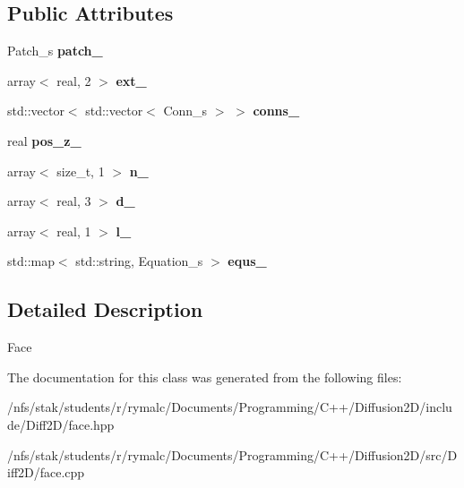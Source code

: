 \subsection*{Public Attributes}
\begin{DoxyCompactItemize}
\item 
\hypertarget{classFace_a2e53c055a4d8492b42995db563e1fc7a}{
Patch\_\-s {\bfseries patch\_\-}}
\label{classFace_a2e53c055a4d8492b42995db563e1fc7a}

\item 
\hypertarget{classFace_a0922668c4175d0274024a5869b310a63}{
array$<$ real, 2 $>$ {\bfseries ext\_\-}}
\label{classFace_a0922668c4175d0274024a5869b310a63}

\item 
\hypertarget{classFace_ac831a8581fa641c54f4adb6e6b3dfe71}{
std::vector$<$ std::vector$<$ Conn\_\-s $>$ $>$ {\bfseries conns\_\-}}
\label{classFace_ac831a8581fa641c54f4adb6e6b3dfe71}

\item 
\hypertarget{classFace_a639f6d684b3a55d69528b5b6f5976937}{
real {\bfseries pos\_\-z\_\-}}
\label{classFace_a639f6d684b3a55d69528b5b6f5976937}

\item 
\hypertarget{classFace_af798b428f231a2f7fad13a386a5c4d7f}{
array$<$ size\_\-t, 1 $>$ {\bfseries n\_\-}}
\label{classFace_af798b428f231a2f7fad13a386a5c4d7f}

\item 
\hypertarget{classFace_a7d41239f934e8819874b5fb515d43380}{
array$<$ real, 3 $>$ {\bfseries d\_\-}}
\label{classFace_a7d41239f934e8819874b5fb515d43380}

\item 
\hypertarget{classFace_a75033fb2521fcb2c613782f831f42bb3}{
array$<$ real, 1 $>$ {\bfseries l\_\-}}
\label{classFace_a75033fb2521fcb2c613782f831f42bb3}

\item 
\hypertarget{classFace_a46b37a1eaba00ad44cf46b6da1391b30}{
std::map$<$ std::string, Equation\_\-s $>$ {\bfseries equs\_\-}}
\label{classFace_a46b37a1eaba00ad44cf46b6da1391b30}

\end{DoxyCompactItemize}


\subsection{Detailed Description}
Face 

The documentation for this class was generated from the following files:\begin{DoxyCompactItemize}
\item 
/nfs/stak/students/r/rymalc/Documents/Programming/C++/Diffusion2D/include/Diff2D/face.hpp\item 
/nfs/stak/students/r/rymalc/Documents/Programming/C++/Diffusion2D/src/Diff2D/face.cpp\end{DoxyCompactItemize}

